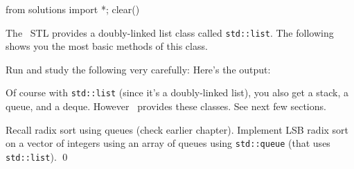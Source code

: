 \begin{python0}
from solutions import *; clear()
\end{python0}

The \cpp\ STL provides a doubly-linked list class called \verb!std::list!.
The following shows you the most basic methods of this class.

Run and study the following very carefully:
Here's the output:


Of course with \verb!std::list! (since it's a doubly-linked list),
you also get a stack, a queue, and a deque.
However \cpp\ provides these classes. See next few sections.

\begin{ex}
  Recall radix sort using queues (check earlier chapter).
  Implement LSB radix sort on a vector of integers using an array of
  queues using \verb!std::queue! (that uses \verb!std::list!).
  \qed
\end{ex}
